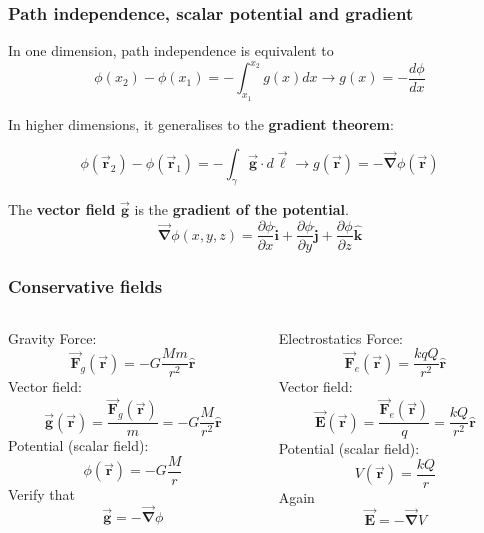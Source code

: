\documentclass{beamer}
\newcommand{\vc}[1]{\vec{\boldsymbol{#1}}}
\newcommand{\hr}{\hat{\boldsymbol{r}}}
\newcommand{\hi}{\hat{\boldsymbol{i}}}
\newcommand{\hj}{\hat{\boldsymbol{j}}}
\newcommand{\hk}{\hat{\boldsymbol{k}}}
\begin{document}
\begin{frame}
	\frametitle{Path independence, scalar potential and gradient}
	\small
In  one dimension, path independence is equivalent to
\begin{equation}
  \phi(x_2)-\phi(x_1)=-\int_{x_1}^{x_2}g(x)dx\rightarrow g(x) = -\dfrac{d\phi}{dx}
  \end{equation}
  
 In higher dimensions, it generalises to the \textbf{gradient theorem}: 
 
 \begin{equation}
    \phi(\vc{r}_2)-\phi(\vc{r}_1)=-\int_{\gamma}\vc{g}\cdot d\vc{\ell}\rightarrow g(\vc{r})=-\vc{\nabla}\phi(\vc{r})
\end{equation}

The \textbf{vector field} $\vc{g}$ is the \textbf{gradient of the potential}.
\begin{equation}
	\vc{\nabla}\phi(x,y,z) = \dfrac{\partial \phi}{\partial x}\hi+\dfrac{\partial \phi}{\partial y}\hj+\dfrac{\partial \phi}{\partial z}\hk
\end{equation}
\end{frame}





\begin{frame}
	\frametitle{Conservative fields}
	\footnotesize
\begin{columns}[T]
\begin{column}{0.5\textwidth}{
\begin{block}{Gravity}
Force:
$$
 \vc{F}_g(\vc{r}) =- G\dfrac{Mm }{r^2}\hr
$$
Vector field:
$$
  \vc{g}(\vc{r}) =\dfrac{\vc{F}_g(\vc{r})}{m}=- G\dfrac{M }{r^2}\hr
$$
Potential (scalar field):
$$
\phi(\vc{r})=-G\dfrac{M}{r}
$$
Verify that 
$$\vc{g}=-\vc{\nabla}\phi$$
\end{block}}
\end{column}
\begin{column}{0.5\textwidth}\pause
\begin{block}{Electrostatics}
Force:
\vspace{12pt}
$$
  \vc{F}_e(\vc{r}) =
\dfrac{k qQ}{r^2}\hr
$$
\pause
Vector field:
$$
  \vc{E}(\vc{r}) =\dfrac{ \vc{F}_e(\vc{r})}{q}=\dfrac{kQ }{r^2}\hr
$$
\pause
Potential (scalar field):
$$
V(\vc{r})=\dfrac{kQ}{r}
$$
Again
\vspace{7.5pt}
$$\vc{E} = -\vc{\nabla}V$$
\end{block}
\end{column}
	
\end{columns}


\end{frame}
\end{document}
